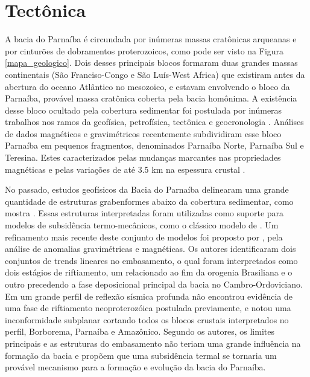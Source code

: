 \section{Tectônica}

A bacia do Parnaíba é circundada por inúmeras massas cratônicas arqueanas e por cinturões de dobramentos proterozoicos, como pode ser visto na Figura \ref{mapa_geologico}. Dois desses principais blocos formaram duas grandes massas continentais (São Franciso-Congo e São Luís-West Africa) que existiram antes da abertura do oceano Atlântico no mesozoico, e estavam envolvendo o bloco da Parnaíba, provável massa cratônica coberta pela bacia homônima. A existência desse bloco ocultado pela cobertura sedimentar foi postulada por inúmeras trabalhos nos ramos da geofísica, petrofísica, tectônica e geocronologia \citep{de_brito_neves_influence_1984, cordani_bacia_2009,fuck_rodinia_2008,de_castro_crustal_2014}. Análises de dados magnéticos e gravimétricos recentemente subdividiram esse bloco Parnaíba em pequenos fragmentos, denominados Parnaíba Norte, Parnaíba Sul e Teresina. Estes caracterizados pelas mudanças marcantes nas propriedades magnéticas e pelas variações de até 3.5 km na espessura crustal \citep{de_castro_crustal_2014}. 

No passado, estudos geofísicos da Bacia do Parnaíba delinearam uma grande quantidade de estruturas grabenformes abaixo da cobertura sedimentar, como mostra \cite{de_brito_neves_influence_1984,cordani_bacia_2009}. Essas estruturas interpretadas foram utilizadas como suporte para modelos de subsidência termo-mecânicos, como o clássico modelo de \cite{mckenzie_remarks_1978}. Um refinamento mais recente deste conjunto de modelos foi proposto por \cite{de_castro_crustal_2014}, pela análise de anomalias gravimétricas e magnéticas. Os autores identificaram dois conjuntos de trends lineares no embasamento, o qual foram interpretados como dois estágios de riftiamento, um relacionado ao fim da orogenia Brasiliana e o outro precedendo a fase deposicional principal da bacia no Cambro-Ordoviciano. 
Em um grande perfil de reflexão sísmica profunda \cite{daly_brasiliano_2014} não encontrou evidência de uma fase de riftiamento neoproterozóica postulada previamente, e notou uma inconformidade subplanar cortando todos os blocos crustais interpretados no perfil, Borborema, Parnaíba e Amazônico. Segundo os autores, os limites principais e as estruturas do embasamento não teriam uma grande influência na formação da bacia e propõem que uma subsidência termal se tornaria um provável mecanismo para a formação e evolução da bacia do Parnaíba.

